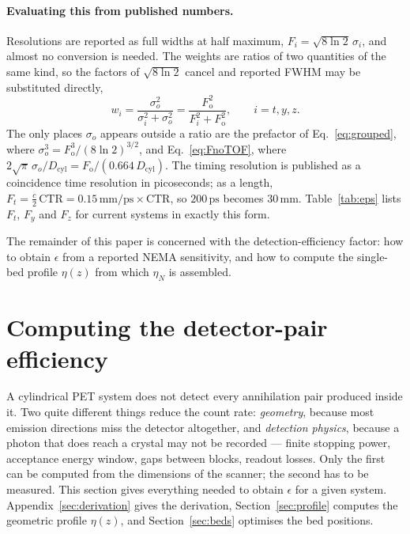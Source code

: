 \documentclass[11pt,a4paper]{article}
\newcommand{\Dcyl}{D_{\mathrm{cyl}}}
\newcommand{\Fo}{F_{\mathrm{o}}}
\newcommand{\Ft}{F_{t}}
\newcommand{\Fy}{F_{y}}
\newcommand{\Fz}{F_{z}}
\newcommand{\so}{\sigma_{\!o}}
\newcommand{\kf}{(8\ln 2)^{3/2}}
\begin{document}
\paragraph{Evaluating this from published numbers.}
Resolutions are reported as full widths at half maximum, $F_i=\sqrt{8\ln2}\,\sigma_i$, and
almost no conversion is needed. The weights are ratios of two quantities of the same kind,
so the factors of $\sqrt{8\ln2}$ cancel and reported FWHM may be substituted directly,
\begin{equation}
  w_i=\frac{\so^{2}}{\sigma_i^{2}+\so^{2}}=\frac{\Fo^{2}}{F_i^{2}+\Fo^{2}},
  \qquad i=t,y,z .
  \label{eq:wFWHM}
\end{equation}
The only places $\so$ appears outside a ratio are the prefactor of Eq.~\eqref{eq:grouped},
where $\so^{3}=\Fo^{3}/\kf$, and Eq.~\eqref{eq:FnoTOF}, where
$2\sqrt{\pi}\,\so/\Dcyl=\Fo/(0.664\,\Dcyl)$. The timing resolution is published as a
coincidence time resolution in picoseconds; as a length,
$\Ft=\tfrac{c}{2}\,\mathrm{CTR}=0.15\,\mathrm{mm/ps}\times\mathrm{CTR}$, so
$200\,\mathrm{ps}$ becomes $30\,\mathrm{mm}$. Table~\ref{tab:eps} lists $\Ft$, $\Fy$ and
$\Fz$ for current systems in exactly this form.

The remainder of this paper is concerned with the detection-efficiency factor: how to obtain
$\epsilon$ from a reported NEMA sensitivity, and how to compute the single-bed profile
$\eta(z)$ from which $\eta_N$ is assembled.

\section{Computing the detector-pair efficiency}
\label{sec:recipe}

A cylindrical PET system does not detect every annihilation pair produced inside it. Two
quite different things reduce the count rate: \emph{geometry}, because most emission
directions miss the detector altogether, and \emph{detection physics}, because a photon that
does reach a crystal may not be recorded --- finite stopping power, acceptance energy window, gaps
between blocks, readout losses. Only the first can be computed from the dimensions of the
scanner; the second has to be measured. This section gives everything needed to obtain
$\epsilon$ for a given system. Appendix~\ref{sec:derivation} gives the derivation,
Section~\ref{sec:profile} computes the geometric profile $\eta(z)$,
and Section~\ref{sec:beds} optimises the bed positions.
\end{document}
